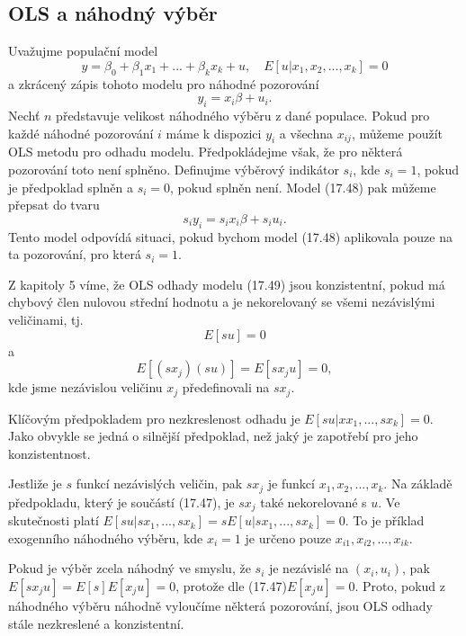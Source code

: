 \subsection{OLS a náhodný výběr}

Uvažujme populační model
\begin{equation}
y = \beta_0 + \beta_1 x_1 + ... + \beta_k x_k + u, \quad E[u | x_1, x_2, ..., x_k] = 0
\end{equation}
a zkrácený zápis tohoto modelu pro náhodné pozorování
\begin{equation}
y_i = x_i \beta + u_i.
\end{equation}
Nechť $n$ představuje velikost náhodného výběru z dané populace. Pokud pro každé náhodné pozorování $i$ máme k dispozici $y_i$ a všechna $x_{ij}$, můžeme použít OLS metodu pro odhadu modelu. Předpokládejme však, že pro některá pozorování toto není splněno. Definujme výběrový indikátor $s_i$, kde $s_i = 1$, pokud je předpoklad splněn a $s_i = 0$, pokud splněn není. Model (17.48) pak můžeme přepsat do tvaru
\begin{equation}
s_i y_i = s_i x_i \beta + s_i u_i.
\end{equation}
Tento model odpovídá situaci, pokud bychom model (17.48) aplikovala pouze na ta pozorování, pro která $s_i = 1$.

Z kapitoly 5 víme, že OLS odhady modelu (17.49) jsou konzistentní, pokud má chybový člen nulovou střední hodnotu a je nekorelovaný se všemi nezávislými veličinami, tj.
\begin{equation}
E[su] = 0
\end{equation}
a
\begin{equation}
E[(sx_j)(su)] = E[sx_ju] = 0,
\end{equation}
kde jsme nezávislou veličinu $x_j$ předefinovali na $s x_j$.

Klíčovým předpokladem pro nezkreslenost odhadu je $E[su | x x_1, ..., s x_k] = 0$. Jako obvykle se jedná o silnější předpoklad, než jaký je zapotřebí pro jeho konzistentnost.

Jestliže je $s$ funkcí nezávislých veličin, pak $s x_j$ je funkcí $x_1, x_2, ..., x_k$. Na základě předpokladu, který je součástí (17.47), je $s x_j$ také nekorelované s $u$. Ve skutečnosti platí $E[su|s x_1, ..., sx_k] = s E[u|sx_1, ..., s x_k] = 0$. To je příklad exogenního náhodného výběru, kde $x_i = 1$ je určeno pouze $x_{i1}, x_{i2}, ..., x_{ik}$.

Pokud je výběr zcela náhodný ve smyslu, že $s_i$ je nezávislé na $(x_i, u_i)$, pak $E[s x_j u] = E[s]E[x_j u] = 0$, protože dle (17.47)$E[x_ju] = 0$. Proto, pokud z náhodného výběru náhodně vyloučíme některá pozorování, jsou OLS odhady stále nezkreslené a konzistentní.

